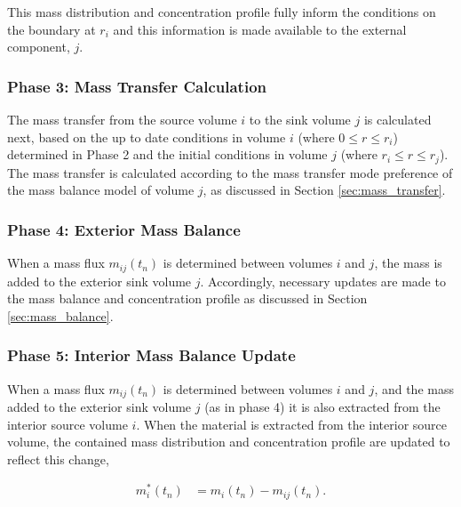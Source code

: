 This mass distribution and concentration profile fully inform 
the conditions on the boundary at $r_i$ and this information is made available 
to the external component, $j$.


\subsubsection{Phase 3: Mass Transfer Calculation}

The mass transfer from the source volume $i$ to the sink volume $j$ is 
calculated next, based on the up to date conditions in volume $i$ (where $0\le r \le r_i$) 
determined in Phase 2 and the initial conditions in volume $j$ (where $r_i \le 
r \le r_j$). The mass transfer is calculated according to the mass transfer mode 
preference of the mass balance model of volume $j$, as discussed in Section 
\ref{sec:mass_transfer}. 


\subsubsection{Phase 4: Exterior Mass Balance}

When a mass flux $m_{ij}(t_n)$ is determined between volumes $i$ and $j$, the 
mass is added to the exterior sink volume $j$. Accordingly, necessary updates 
are made to the mass balance and concentration profile as discussed in Section 
\ref{sec:mass_balance}.

\subsubsection{Phase 5: Interior Mass Balance Update}

When a mass flux $m_{ij}(t_n)$ is determined between volumes $i$ and $j$, and 
the mass added to the exterior sink volume $j$ (as in phase 4) it is also 
extracted from the interior source volume $i$.  When the material is extracted 
from the interior source volume, the contained mass distribution and 
concentration profile are updated to reflect this change,

\begin{align}
  m_{i}^*(t_n) &= m_i(t_n) - m_{ij}(t_n).
\end{align}

